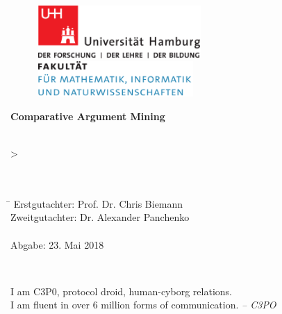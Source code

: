 \begin{titlepage}

  \setcounter{page}{-1}

	\begin{figure}[h]
		\begin{minipage}[b]{62mm}
			\includegraphics[width=62mm]{images/unilogo}
		\end{minipage}
		\hspace{4cm}
		\begin{minipage}[b]{59mm}
			\includegraphics[width=59mm]{images/minlogo}
		\end{minipage}
	\end{figure}

	\vfill
	
	\begin{center}
		\vspace{14mm}
		\noindent \textbf{\huge
		  Comparative Argument Mining
		}
		\vspace{60mm}	
	\end{center}
	
	\vfill
	
	 \\
>	 \\
	 \\
	 \\
	\begin{tabbing}
	\hspace{8em} \=  \kill
	Erstgutachter: \> Prof. Dr. Chris Biemann \\
	Zweitgutachter: \> Dr. Alexander Panchenko \\
	~ \\
	Abgabe: 23. Mai 2018
	\end{tabbing}
	
	\newpage 
	\thispagestyle{empty}
	\setcounter{page}{0}

	~\\ \vfill \noindent 
	
I am C3P0, protocol droid, human-cyborg relations.\\I am fluent in over 6 million forms of communication.
	\textit{-- C3PO}
\end{titlepage}

